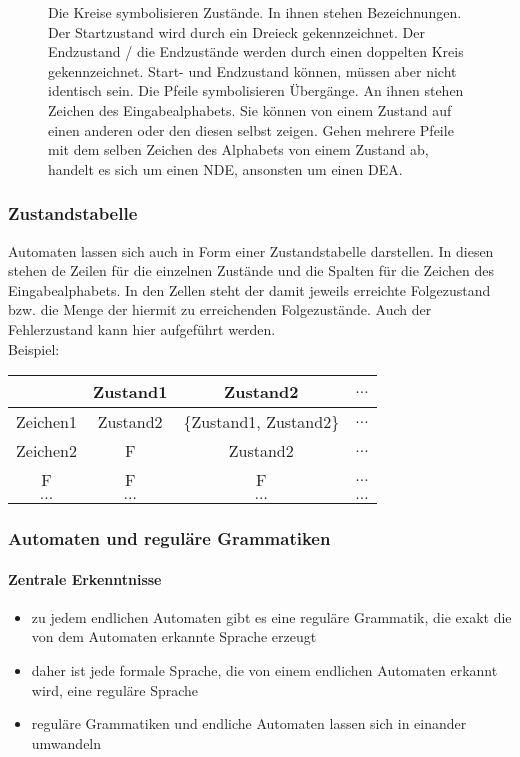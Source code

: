 \documentclass{article}
\begin{document}
	\begin{figure}[H]
		\centering
		
		\caption{Die Kreise symbolisieren Zustände. In ihnen stehen Bezeichnungen. Der Startzustand wird durch ein Dreieck gekennzeichnet. Der  Endzustand / die Endzustände werden durch einen doppelten Kreis gekennzeichnet. Start- und Endzustand können, müssen aber nicht identisch sein. Die Pfeile symbolisieren Übergänge. An ihnen stehen Zeichen des Eingabealphabets. Sie können von einem Zustand auf einen anderen oder den diesen selbst zeigen. Gehen mehrere Pfeile mit dem selben Zeichen des Alphabets von einem Zustand ab, handelt es sich um einen NDE, ansonsten um einen DEA.}
	\end{figure}	
		
	\subsubsection{Zustandstabelle}
		
	Automaten lassen sich auch in Form einer Zustandstabelle darstellen. In diesen stehen de Zeilen für die einzelnen Zustände und die Spalten für die Zeichen des Eingabealphabets. In den Zellen steht der damit jeweils erreichte Folgezustand bzw. die Menge der hiermit zu erreichenden Folgezustände. Auch der Fehlerzustand kann hier aufgeführt werden.\\
	Beispiel:
		
	\begin{center}
		\begin{tabular}{ |c|c|c|c| } 
 			\hline
  			& Zustand1 & Zustand2 & $\ldots$ \\ 
  			\hline
 			Zeichen1 & Zustand2 & \{Zustand1, Zustand2\} & $\ldots$ \\ 
			\hline
 			Zeichen2 & F & Zustand2 & $\ldots$ \\ 
 			\hline
 			F & F & F & $\ldots$ \\
 			\hline
 			$\ldots$ & $\ldots$ & $\ldots$ & $\ldots$ \\
 			\hline
		\end{tabular}
	\end{center}
		
	\subsubsection{Automaten und reguläre Grammatiken}
		
	\paragraph{Zentrale Erkenntnisse}
	\begin{itemize}
		\item zu jedem endlichen Automaten gibt es eine reguläre Grammatik, die exakt die von dem Automaten erkannte Sprache erzeugt
		\item daher ist jede formale Sprache, die von einem endlichen Automaten erkannt wird, eine reguläre Sprache
		\item reguläre Grammatiken und endliche Automaten lassen sich in einander umwandeln
	\end{itemize}
		
\end{document}

